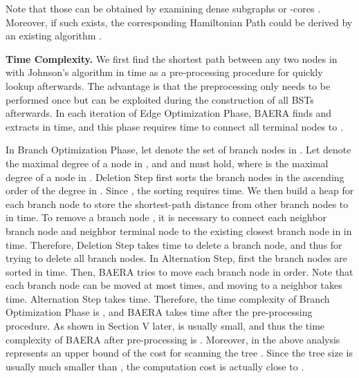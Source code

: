 \documentclass[conference]{IEEEtran}
\begin{document}
Note that those  can be obtained by examining dense subgraphs \cite{Khuller09ICALP} or -cores \cite{Seidman1983}. Moreover, if such  exists, the corresponding Hamiltonian Path  could be derived by an existing algorithm \cite{Palmer1997}.

\textbf{Time Complexity. }We first find the shortest path between any two
nodes in  with Johnson's algorithm in  time
as a pre-processing procedure for quickly lookup afterwards. The advantage is
that the preprocessing only needs to be performed once but can be exploited
during the construction of all BSTs afterwards. In each iteration of Edge Optimization Phase, BAERA finds  and extracts  in  time, and this phase
requires  time to connect all terminal nodes to .

In Branch Optimization Phase, let  denote the set of branch nodes in .
Let  denote the maximal degree of a node in , and  and  must hold, where 
is the maximal degree of a node in . Deletion Step first sorts the branch
nodes in the ascending order of the degree in . Since , the
sorting requires  time. We then build a heap for each branch node to store the
shortest-path distance from other branch nodes to  in  time. To
remove a branch node , it is necessary to connect each neighbor
branch node and neighbor terminal node  to the existing closest branch
node  in  in  time. Therefore, Deletion Step takes  time to delete a branch node, and thus  for trying to delete all branch nodes. In Alternation Step, first the branch nodes are sorted in  time.
Then, BAERA tries to move each branch node in order. Note that each branch node  can be moved at most  times, and moving  to a neighbor takes  time. Alternation Step takes  time. Therefore, the time
complexity of Branch Optimization Phase is ,
and BAERA takes  time after the
pre-processing procedure. As shown in Section V later,  is
usually small, and thus the time complexity of BAERA after pre-processing is . Moreover,  in the above analysis represents an upper bound of the cost for scanning the tree . Since the tree size is usually much smaller than , the computation cost is actually close to .
\end{document}
